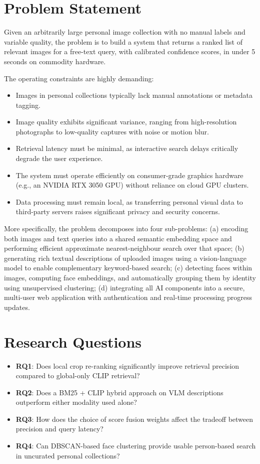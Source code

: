 \documentclass[12pt,a4paper,oneside]{report}
\begin{document}
\section{Problem Statement}

Given an arbitrarily large personal image collection with no manual labels and variable quality, the problem is to build a system that returns a ranked list of relevant images for a free-text query, with calibrated confidence scores, in under 5 seconds on commodity hardware.

The operating constraints are highly demanding:
\begin{itemize}[leftmargin=*]
  \item Images in personal collections typically lack manual annotations or metadata tagging.
  \item Image quality exhibits significant variance, ranging from high-resolution photographs to low-quality captures with noise or motion blur.
  \item Retrieval latency must be minimal, as interactive search delays critically degrade the user experience.
  \item The system must operate efficiently on consumer-grade graphics hardware (e.g., an NVIDIA RTX 3050 GPU) without reliance on cloud GPU clusters.
  \item Data processing must remain local, as transferring personal visual data to third-party servers raises significant privacy and security concerns.
\end{itemize}

More specifically, the problem decomposes into four sub-problems: (a) encoding both images and text queries into a shared semantic embedding space and performing efficient approximate nearest-neighbour search over that space; (b) generating rich textual descriptions of uploaded images using a vision-language model to enable complementary keyword-based search; (c) detecting faces within images, computing face embeddings, and automatically grouping them by identity using unsupervised clustering; (d) integrating all AI components into a secure, multi-user web application with authentication and real-time processing progress updates.

\section{Research Questions}

\begin{itemize}[leftmargin=*]
  \item \textbf{RQ1}: Does local crop re-ranking significantly improve retrieval precision compared to global-only CLIP retrieval?
  \item \textbf{RQ2}: Does a BM25 + CLIP hybrid approach on VLM descriptions outperform either modality used alone?
  \item \textbf{RQ3}: How does the choice of score fusion weights affect the tradeoff between precision and query latency?
  \item \textbf{RQ4}: Can DBSCAN-based face clustering provide usable person-based search in uncurated personal collections?
\end{itemize}
\end{document}
